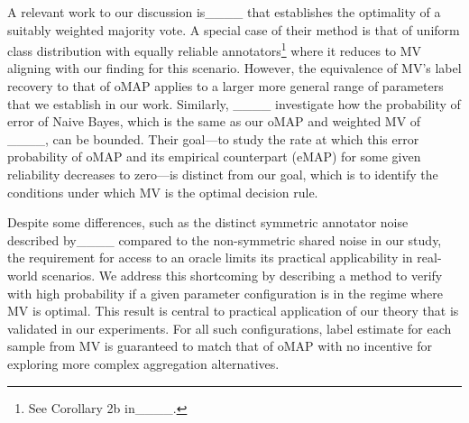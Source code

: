 
A relevant work to our discussion is____ that establishes the optimality of a suitably weighted majority vote.
A special case of their method is that of uniform class distribution with equally reliable annotators\footnote{See Corollary 2b in____.} where it reduces to MV aligning with our finding for this scenario.
However, the equivalence of MV's label recovery to that of oMAP applies to a larger more general range of parameters that we establish in our work. Similarly, ____ investigate how the probability of error of Naive Bayes, which is the same as our oMAP and weighted MV of ____, can be bounded. Their goal—to study the rate at which this error probability of oMAP and its empirical counterpart (eMAP) for some given reliability decreases to zero—is distinct from our goal, which is to identify the conditions under which MV is the optimal decision rule. 

Despite some differences, such as the distinct symmetric annotator noise described by____ compared to the non-symmetric shared noise in our study, the requirement for access to an oracle limits its practical applicability in real-world scenarios. We address this shortcoming by describing a method to verify with high probability if a given parameter configuration is in the regime where MV is optimal.
This result is central to practical application of our theory that is validated in our experiments.
For all such configurations, label estimate for each sample from MV is guaranteed to match that of oMAP with no incentive for exploring more complex aggregation alternatives.